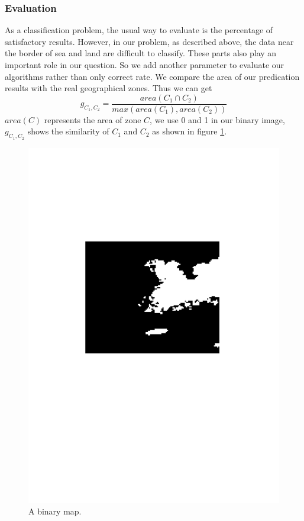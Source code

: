 \subsubsection{Evaluation}
As a classification problem, the usual way to evaluate is the percentage of satisfactory results. However, in our problem, as described above, the data near the border of sea and land are difficult to classify. These parts also play an important role in our question. So we add another parameter to evaluate our algorithms rather than only correct rate. We compare the area of our predication results with the real geographical zones. Thus we can get
\begin{equation}
g_{C_1, C_2} = \frac{area({C_1\cap C_2})}{max(area({C_1}), area({C_2}))}
\end{equation}
$area(C)$ represents the area of zone $C$, we use 0 and 1 in our binary image, $g_{C_1, C_2}$ shows the similarity of $C_1$ and $C_2$ as shown in figure \ref{fig:binary}.
\begin{figure}
	\centering
	\includegraphics[height=0.25\textheight]{figures/binary}
	\caption{A binary map.}
	\label{fig:binary}
\end{figure}

